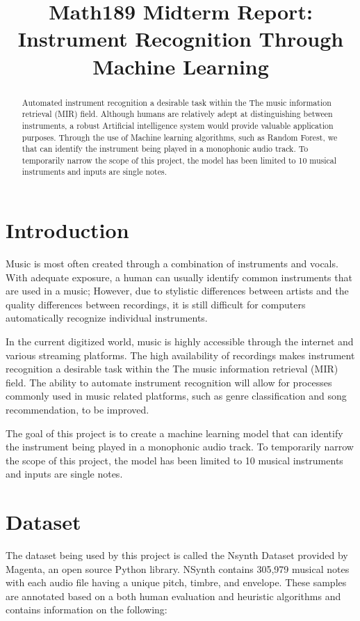 \documentclass{article}
\title{Math189 Midterm Report: Instrument Recognition Through Machine Learning}
\begin{document}
\maketitle

\begin{abstract}
  Automated instrument recognition a desirable task within the The music information retrieval (MIR) field. Although humans are relatively adept at distinguishing between instruments, a robust Artificial intelligence system would provide valuable application purposes. Through the use of Machine learning algorithms, such as Random Forest, we that can identify the instrument being played in a monophonic audio track. To temporarily narrow the scope of this project, the model has been limited to 10 musical instruments and inputs are single notes.
\end{abstract}

\section{Introduction}

Music is most often created through a combination of instruments and vocals. With adequate exposure, a human can usually identify common instruments that are used in a music; However, due to stylistic differences between artists and the quality differences between recordings, it is still difficult for computers automatically recognize individual instruments.

In the current digitized world, music is highly accessible through the internet and various streaming platforms. The high availability of recordings makes instrument recognition a desirable task within the The music information retrieval (MIR) field. The ability to automate instrument recognition will allow for processes commonly used in music related platforms, such as genre classification and song recommendation, to be improved.

The goal of this project is to create a machine learning model that can identify the instrument being played in a monophonic audio track. To temporarily narrow the scope of this project, the model has been limited to 10 musical instruments and inputs are single notes.

\section{Dataset}
\label{Dataset}

The dataset being used by this project is called the Nsynth Dataset provided by Magenta, an open source Python library. NSynth contains 305,979 musical notes with each audio file having a unique pitch, timbre, and envelope. These samples are annotated based on a both human evaluation and heuristic algorithms and contains information on the following:
\end{document}
